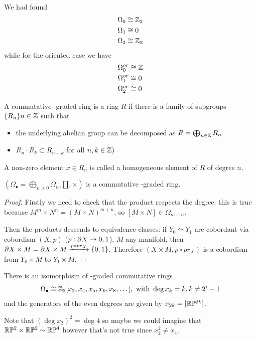 We had found 
\begin{align}
    &\Omega_0 \cong \mathbb{Z}_2 \\
    &\Omega_1 \cong 0    \\
    &\Omega_2 \cong \mathbb{Z}_2
\end{align}
while for the oriented case we have
\begin{align}
    &\Omega_0^{or} \cong \mathbb{Z} \\
    &\Omega_1^{or} \cong 0  \\
    &\Omega_2^{or} \cong 0
\end{align}
\begin{defn}
A commutative \Z-graded ring is a ring $R$ if there is a family of subgroups $\{R_n\}n\in\mathbb{Z}$ such that 
\begin{itemize}
\item the underlying abelian group can be decomposed as $R=\bigoplus_{n \in \mathbb{Z}} R_n$
\item $R_n \cdot R_k \subset R_{n+k}$ for all $n,k\in\mathbb{Z})$
\end{itemize}
A non-zero element $x\in R_n$ is called a homogeneous element of $R$ of degree $n$.
\end{defn}

\begin{prop}
    $(\Omega_\bullet = \bigoplus_{n\geq 0} \Omega_n, \amalg, \times)$ is a commutative \Z-graded ring.
\end{prop}
\begin{proof}
    Firstly we need to check that the product respects the degree: this is true because $M^m \times N^n = (M \times N)^{m+n}$, so $[M\times N] \in \Omega_{m+n}$.

    \noindent Then the products descends to equivalence classes: if $Y_0 \simeq Y_1$ are cobordant via cobordism $(X,p)$ ($p:\partial X \to {0,1}$), $M$ any manifold, then $\partial X \times M = \partial X \times M \xrightarrow{p \circ pr_X} \{0,1\}$. Therefore $(X \times M, p \circ pr_X)$ is a cobordism from $Y_0 \times M$ to $Y_1 \times M$.
\end{proof}

\begin{thm}[Thom]
    There is an isomorphism of \Z-graded commutative rings
    \begin{equation}
        \Omega_\bullet \cong \mathbb{Z}_2[x_2, x_4, x_5, x_6, x_8, \dots], \text{ with } \deg x_k = k, k \neq 2^i-1
    \end{equation}
    and the generators of the even degrees are given by $x_{2k} = [\mathbb{R}\mathbb{P}^{2k}]$.
\end{thm}
\begin{rem}
    Note that $(\deg x_2)^2 = \deg 4$ so maybe we could imagine that $\mathbb{R}\mathbb{P}^2 \times \mathbb{R}\mathbb{P}^2 \sim \mathbb{R}\mathbb{P}^4$ however that's not true since $x_2^2 \neq x_4$.
\end{rem}

